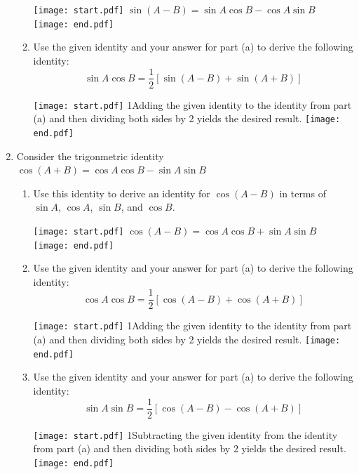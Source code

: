 \documentclass[12pt]{article}
\begin{document}
\begin{enumerate}
\begin{enumerate}
\texttt{[image: start.pdf]}
{{$\sin{(A-B)}=\sin{A}\cos{B}-\cos{A}\sin{B}$}}
\texttt{[image: end.pdf]}


\item Use the given identity and your answer for part (a) to derive the following identity: $$\sin{A}\cos{B}=\frac{1}{2}\left[\sin{(A-B)}+\sin{(A+B)}\right]$$

\texttt{[image: start.pdf]}
{{{1\linewidth}{Adding the given identity to the identity from part (a) and then dividing both sides by 2 yields the desired result.}}}
\texttt{[image: end.pdf]}


\end{enumerate}

\item Consider the trigonmetric identity $\cos{(A+B)}=\cos{A}\cos{B}-\sin{A}\sin{B}$

\begin{enumerate}

\item Use this identity to derive an identity for $\cos{(A-B)}$ in terms of $\sin{A}$, $\cos{A}$, $\sin{B}$, and $\cos{B}$.

\texttt{[image: start.pdf]}
{{$\cos{(A-B)}=\cos{A}\cos{B}+\sin{A}\sin{B}$}}
\texttt{[image: end.pdf]}


\item Use the given identity and your answer for part (a) to derive the following identity: $$\cos{A}\cos{B}=\frac{1}{2}\left[\cos{(A-B)}+\cos{(A+B)}\right]$$

\texttt{[image: start.pdf]}
{{{1\linewidth}{Adding the given identity to the identity from part (a) and then dividing both sides by 2 yields the desired result.}}}
\texttt{[image: end.pdf]}


\item Use the given identity and your answer for part (a) to derive the following identity: $$\sin{A}\sin{B}=\frac{1}{2}\left[\cos{(A-B)}-\cos{(A+B)}\right]$$

\texttt{[image: start.pdf]}
{{{1\linewidth}{Subtracting the given identity from the identity from part (a) and then dividing both sides by 2 yields the desired result.}}}
\texttt{[image: end.pdf]}


\end{enumerate}

\end{enumerate}

\end{document}
